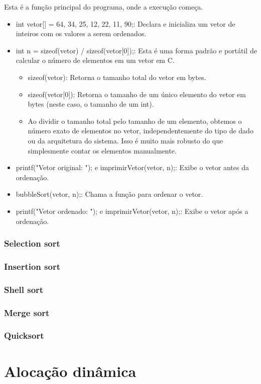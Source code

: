 \documentclass{report}
\begin{document}
\begin{enumerate}
		Esta é a função principal do programa, onde a execução começa.
		
		\begin{itemize}
			\item int vetor[] = {64, 34, 25, 12, 22, 11, 90};: Declara e inicializa um vetor de inteiros com os valores a serem ordenados.
			
			\item int n = sizeof(vetor) / sizeof(vetor[0]);: Esta é uma forma padrão e portátil de calcular o número de elementos em um vetor em C.
			
			\begin{itemize}
				\item sizeof(vetor): Retorna o tamanho total do vetor em bytes.
				\item sizeof(vetor[0]): Retorna o tamanho de um único elemento do vetor em bytes (neste caso, o tamanho de um int).
				\item Ao dividir o tamanho total pelo tamanho de um elemento, obtemos o número exato de elementos no vetor, independentemente do tipo de dado ou da arquitetura do sistema. Isso é muito mais robusto do que simplesmente contar os elementos manualmente.
			\end{itemize}
			\item printf("Vetor original: "); e imprimirVetor(vetor, n);: Exibe o vetor antes da ordenação.
			\item bubbleSort(vetor, n);: Chama a função para ordenar o vetor.
			\item printf("Vetor ordenado: "); e imprimirVetor(vetor, n);: Exibe o vetor após a ordenação.
		\end{itemize}
	\end{enumerate}
	\subsection{Selection sort}
	\subsection{Insertion sort}
	\subsection{Shell sort}
	\subsection{Merge sort}
	\subsection{Quicksort}
	
	\chapter{Alocação dinâmica}
	
	
	
	
	
	
\end{document}
